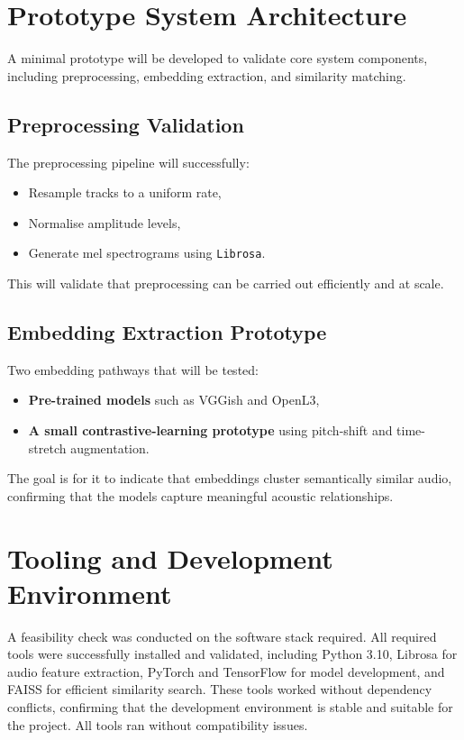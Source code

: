 \documentclass[../Thesis]{subfiles}
\begin{document}
\section{Prototype System Architecture}
A minimal prototype will be developed to validate core system components, including preprocessing, embedding extraction, and similarity matching.

\subsection{Preprocessing Validation}
The preprocessing pipeline will successfully:
\begin{itemize}
    \item Resample tracks to a uniform rate,
    \item Normalise amplitude levels,
    \item Generate mel spectrograms using \texttt{Librosa}.
\end{itemize}

This will validate that preprocessing can be carried out efficiently and at scale.

\subsection{Embedding Extraction Prototype}
Two embedding pathways that will be tested:
\begin{itemize}
    \item \textbf{Pre-trained models} such as VGGish and OpenL3,
    \item \textbf{A small contrastive-learning prototype} using pitch-shift and time-stretch augmentation.
\end{itemize}

The goal is for it to indicate that embeddings cluster semantically similar audio, confirming that the models capture meaningful acoustic relationships.

\section{Tooling and Development Environment}
A feasibility check was conducted on the software stack required. All required tools were successfully installed and validated, including Python 3.10, Librosa for audio feature extraction, PyTorch and TensorFlow for model development, and FAISS for efficient similarity search. These tools worked without dependency conflicts, confirming that the development environment is stable and suitable for the project. All tools ran without compatibility issues.
\end{document}
